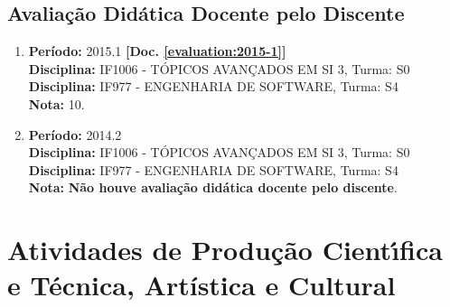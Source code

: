 \documentclass[a4paper,oneside,10pt]{article}
\begin{document}
\vspace{5.0cm}
\subsection{Avaliação Didática Docente pelo Discente}
\vspace{0.3cm}


\begin{enumerate}
\renewcommand{\labelenumi}{{\large\bfseries\arabic{enumi}.}}

\item   \textbf{Período:} 2015.1 \textbf{[Doc. \ref{evaluation:2015-1}]}\\
        \textbf{Disciplina:} IF1006 - TÓPICOS AVANÇADOS EM SI 3, Turma: S0\\
        \textbf{Disciplina:} IF977 - ENGENHARIA DE SOFTWARE, Turma: S4\\
        \textbf{Nota:} 10.

\item   \textbf{Período:} 2014.2 \\
        \textbf{Disciplina:} IF1006 - TÓPICOS AVANÇADOS EM SI 3, Turma: S0\\
        \textbf{Disciplina:} IF977 - ENGENHARIA DE SOFTWARE, Turma: S4\\
        \textbf{Nota:} \textbf{Não houve avaliação didática docente pelo discente}.

\end{enumerate}

\newpage
\section{Atividades de Produ\c{c}\~{a}o Cient\'{\i}fica e T\'{e}cnica, Art\'{i}stica e Cultural}

\end{document}
